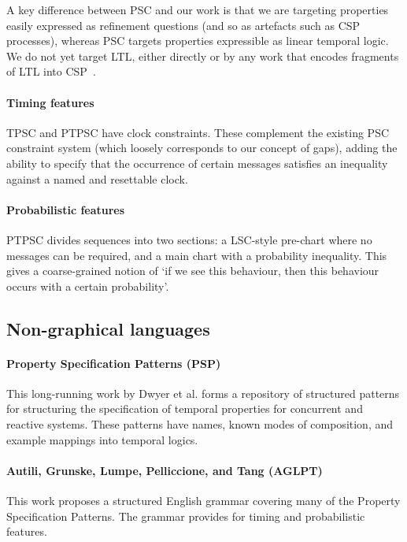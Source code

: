 A key difference between PSC and our work is that we are
targeting  properties easily expressed as refinement questions
(and so as artefacts such as CSP processes), whereas PSC targets properties
expressible as linear temporal logic.  We do not yet target LTL,
either directly or by any work that encodes fragments of LTL into
CSP~\cite{fdrspin,Lowe08-CommunicatingProcessSpecification}.

\paragraph{Timing features}
TPSC and PTPSC have clock constraints.  These complement the existing PSC constraint system
(which loosely corresponds to our concept of gaps), adding the ability to
specify that the occurrence of certain messages satisfies an inequality against
a named and resettable clock.

\paragraph{Probabilistic features}
PTPSC divides sequences into two sections: a LSC-style pre-chart where no messages can be required,
and a main chart with a probability inequality.  This gives a coarse-grained notion of `if we see
this behaviour, then this behaviour occurs with a certain probability'.

\subsection{Non-graphical languages}

\paragraph{Property Specification Patterns (PSP)}

This long-running work by Dwyer et al. forms a repository of
structured patterns for structuring the specification of temporal
properties for concurrent and reactive systems.  These patterns have names,
known modes of composition, and example mappings into temporal logics.

\paragraph{Autili, Grunske, Lumpe, Pelliccione, and Tang (AGLPT)}

This work proposes a structured English grammar covering many of the Property
Specification Patterns.  The grammar provides for timing and probabilistic
features.

